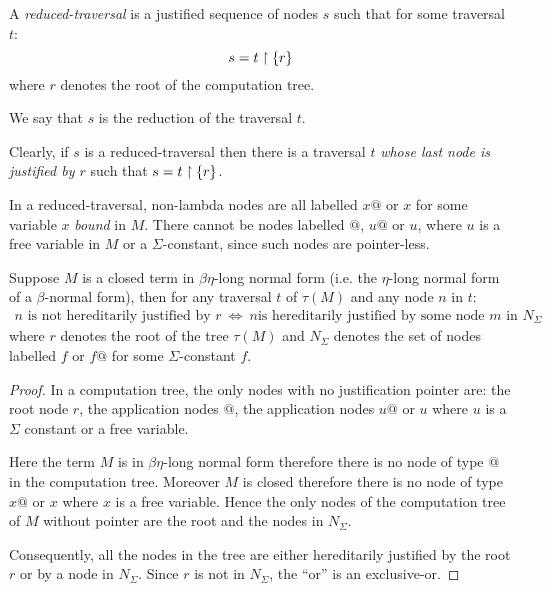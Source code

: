 \begin{dfn}
A \emph{reduced-traversal} is a justified sequence of nodes $s$ such that for some traversal $t$:
$$ s = t \upharpoonright \{ r \} $$
where $r$ denotes the root of the computation tree.

We say that $s$ is the reduction of the traversal $t$.
\end{dfn}

\begin{rem}
\label{rem:redtrav} Clearly, if $s$ is a reduced-traversal then
there is a traversal $t$ \emph{whose last node is justified by $r$}
such that $s = t \upharpoonright \{ r \}$.
\end{rem}

In a reduced-traversal, non-lambda nodes are all labelled $x @$ or
$x$ for some variable $x$ \emph{bound} in $M$. There cannot be nodes
labelled $@$, $u@$ or $u$, where $u$ is a free variable in $M$ or a
$\Sigma$-constant, since such nodes are pointer-less.


\begin{property}
\label{proper:betaeta_trav}
Suppose $M$ is a closed term in $\beta \eta$-long normal form (i.e. the $\eta$-long normal form of a $\beta$-normal form), then
for any traversal $t$ of $\tau(M)$ and any node $n$ in $t$:
\begin{eqnarray*}
n \mbox{ is not hereditarily justified by } r  \  \iff \   n \mbox{
is hereditarily justified by some node $m$ in } N_\Sigma
\end{eqnarray*}
where $r$ denotes the root of the tree
$\tau(M)$ and $N_\Sigma$ denotes the set of nodes labelled $f$ or $f@$ for
some $\Sigma$-constant $f$.
\end{property}
\begin{proof}
In a computation tree, the only nodes with no justification pointer are:
the root node $r$, the application nodes $@$, the application nodes $u @$ or $u$ where $u$ is a $\Sigma$ constant or a free variable.

Here the term $M$ is in $\beta \eta$-long normal form therefore there is no node of type $@$ in the computation tree.
Moreover $M$ is closed therefore there is no node of type $x@$ or $x$ where $x$ is a
free variable. Hence the only nodes of the computation tree of $M$ without pointer are the root and the nodes in $N_\Sigma$.

Consequently, all the nodes in the tree are either hereditarily justified by the root $r$ or by a node in $N_\Sigma$. Since $r$ is not in
$N_\Sigma$, the ``or'' is an exclusive-or.
\end{proof}

